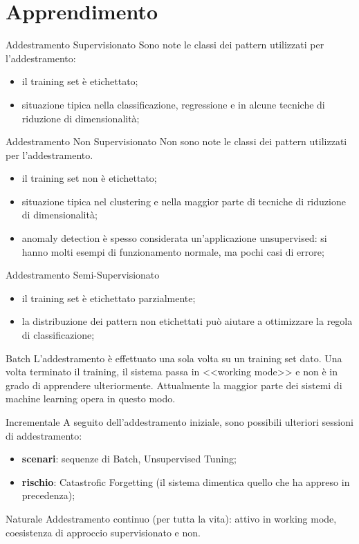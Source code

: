 \section{Apprendimento}\label{sec:apprendimento} %
\begin{definition}{Addestramento Supervisionato}{}
    Sono note le classi dei pattern utilizzati per l'addestramento:
    \begin{itemize}
        \item il training set è etichettato;
        \item situazione tipica nella classificazione, regressione e in alcune tecniche di riduzione di dimensionalità;
    \end{itemize}
\end{definition}
\begin{definition}{Addestramento Non Supervisionato}{}
    Non sono note le classi dei pattern utilizzati per l'addestramento.
    \begin{itemize}
        \item il training set non è etichettato;
        \item situazione tipica nel clustering e nella maggior parte di tecniche di riduzione di dimensionalità;
        \item anomaly detection è spesso considerata un'applicazione unsupervised: si hanno molti esempi di funzionamento normale, ma pochi casi di errore;
    \end{itemize}
\end{definition}
\begin{definition}{Addestramento Semi-Supervisionato}{}
    \begin{itemize}
        \item il training set è etichettato parzialmente;
        \item la distribuzione dei pattern non etichettati può aiutare a ottimizzare la regola di classificazione;
    \end{itemize}
\end{definition}
\begin{definition}{Batch}{}
    L'addestramento è effettuato una sola volta su un training set dato.
    Una volta terminato il training, il sistema passa in <<working mode>> e non è in grado di apprendere ulteriormente.
    Attualmente la maggior parte dei sistemi di machine learning opera in questo modo.
\end{definition}
\begin{definition}{Incrementale}{}
    A seguito dell'addestramento iniziale, sono possibili ulteriori sessioni di addestramento:
    \begin{itemize}
        \item \textbf{scenari}: sequenze di Batch, Unsupervised Tuning;
        \item \textbf{rischio}: Catastrofic Forgetting (il sistema dimentica quello che ha appreso in precedenza);
    \end{itemize}
\end{definition}
\begin{definition}{Naturale}{}
    Addestramento continuo (per tutta la vita): attivo in working mode, coesistenza di approccio supervisionato e non.
\end{definition}
%
%
